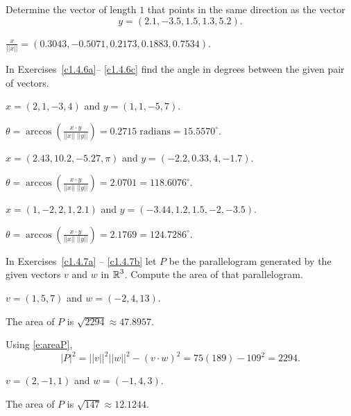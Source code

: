 \documentclass{ximera}
\begin{document}
\begin{exercise} \label{c1.4.5b}
Determine the vector of length $1$ that points in the same direction
as the vector
\[
y=(2.1,-3.5,1.5,1.3,5.2).
\]

\begin{solution}

$\frac{x}{||x||} = (0.3043, -0.5071, 0.2173, 0.1883, 0.7534)$.

\end{solution}
\end{exercise}

\noindent In Exercises~\ref{c1.4.6a}-- \ref{c1.4.6c} find the angle in
degrees between the given pair of vectors.
\begin{exercise} \label{c1.4.6a}
$x=(2,1,-3,4)$ and $y=(1,1,-5,7)$.

\begin{solution}
$\theta =
\arccos \left(\frac{x \cdot y}{||x||\;||y||}\right) =
0.2715 \; \mbox{radians} = 15.5570^\circ$.

\end{solution}
\end{exercise}
\begin{exercise} \label{c1.4.6b}
$x=(2.43, 10.2,-5.27,\pi)$ and $y= (-2.2,0.33,4,-1.7)$.

\begin{solution}
$\theta =
\arccos \left(\frac{x \cdot y}{||x||\;||y||}\right) =
2.0701 = 118.6076^\circ$.

\end{solution}
\end{exercise}
\begin{exercise} \label{c1.4.6c}
$x=(1,-2,2,1,2.1)$ and $y=(-3.44,1.2,1.5,-2,-3.5)$.

\begin{solution}
$\theta =
\arccos \left(\frac{x \cdot y}{||x||\;||y||}\right) =
2.1769 = 124.7286^\circ$.

\end{solution}
\end{exercise}

\noindent In Exercises~\ref{c1.4.7a} -- \ref{c1.4.7b} let $P$ be the 
parallelogram generated by the given vectors $v$ and $w$ in $\mbox{$\Bbb{R}$}^3$.  
Compute the area of that parallelogram.
\begin{exercise} \label{c1.4.7a}
$v=(1,5,7)$ and $w=(-2,4,13)$.

\begin{solution}
\ans The area of $P$ is $\sqrt{2294} \approx 47.8957$.

\soln Using \eqref{e:areaP},
\[
|P|^2 = ||v||^2||w||^2 - (v \cdot w)^2 = 75(189) - 109^2 = 2294.
\]

\end{solution}
\end{exercise}
\begin{exercise} \label{c1.4.7b}
$v=(2,-1,1)$ and $w=(-1,4,3)$.

\begin{solution}
\ans The area of $P$ is $\sqrt{147} \approx 12.1244$.



\end{solution}
\end{exercise}
\end{document}
